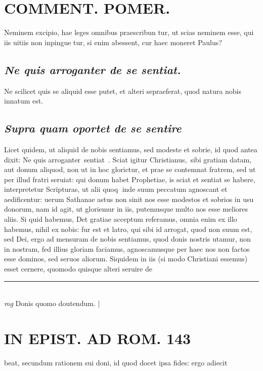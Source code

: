 \documentclass{article}
\begin{document}
\begin{pages}
\section*{COMMENT. POMER.  }\pstart Neminem excipio, hae leges omnibus praescribun tur, ut scias neminem esse, qui iis uitiis non inpingue tur, si enim abessent, cur haec moneret Paulus?  \pend
{}
{}
\subsection*{\textit{Ne quis arroganter de se sentiat. }}\pstart Ne scilicet quis se aliquid esse putet, et alteri sepraeferat, quod natura nobis innatum est.   \pend
{}
{}
\subsection*{\textit{Supra quam oportet de se sentire}}\pstart Licet quidem, ut aliquid de nobis sentiamus, sed modeste et sobrie, id quod antea dixit: Ne quis arroganter sentiat . Sciat igitur Christianus, sibi gratiam datam, aut donum aliquod, non ut in hoc glorictur, et prae se contemnat fratrem, sed ut per illud fratri seruiat: qui donum habet Prophetiae, is sciat et sentiat se habere, interpretetur Scripturas, ut alii quoq inde suum peccatum agnoscant et aedificentur: uerum Sathanae astus non sinit nos esse modestos et sobrios in usu donorum, nam id agit, ut gloriemur in iis, putemusque multo nos esse meliores aliis. Si quid habemus, Det gratiae acceptum referamus, omnia enim ex illo habemus, nihil ex nobis: fur est et latro, qui sibi id arrogat, quod non suum est, sed Dei, ergo ad mensuram de nobis sentiamus, quod donis nostris utamur, non in nostram, fed illius gloriam faciamus, agnoscamusque per haec nos non factos esse dominos, sed seruos aliorum. Siquidem in iis (si modo Christiani essemus) esset cernere, quomodo quisque alteri seruire de\pend
\vspace{0.5cm}\noindent
\vspace{0.2cm}\rule{1cm}{0.2pt}\\ 
\hspace{0.2cm}\textit{mg}
\footnotesize Donis quomo doutendum.  
\normalsize| 
\section*{IN EPIST. AD ROM.  143 }
\marginpar{[ p.]}\pstart beat, secundum rationem sui doni, id quod docet ipsa fides: ergo adiecit  \pend
{}
{}

\end{pages}
\end{document}
